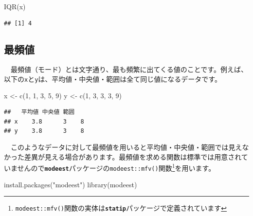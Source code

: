 \documentclass[
  12pt,
]{book}
\newenvironment{Shaded}{\begin{snugshade}}{\end{snugshade}}
\newcommand{\DecValTok}[1]{\textcolor[rgb]{0.00,0.00,0.81}{#1}}
\newcommand{\FunctionTok}[1]{\textcolor[rgb]{0.00,0.00,0.00}{#1}}
\newcommand{\NormalTok}[1]{#1}
\newcommand{\OtherTok}[1]{\textcolor[rgb]{0.56,0.35,0.01}{#1}}
\newcommand{\StringTok}[1]{\textcolor[rgb]{0.31,0.60,0.02}{#1}}
\begin{document}
\begin{Shaded}
\begin{Highlighting}[numbers=left,,]
\FunctionTok{IQR}\NormalTok{(x)}
\end{Highlighting}
\end{Shaded}

\begin{verbatim}
## [1] 4
\end{verbatim}

\newpage

\hypertarget{ux6700ux983bux5024}{%
\subsection{\texorpdfstring{最頻値}{最頻値}}\label{ux6700ux983bux5024}}

　最頻値（モード）とは文字通り、最も頻繁に出てくる値のことです。例えば、以下の\texttt{x}と\texttt{y}は、平均値・中央値・範囲は全て同じ値になるデータです。

\begin{Shaded}
\begin{Highlighting}[numbers=left,,]
\NormalTok{x }\OtherTok{\textless{}{-}} \FunctionTok{c}\NormalTok{(}\DecValTok{1}\NormalTok{, }\DecValTok{1}\NormalTok{, }\DecValTok{3}\NormalTok{, }\DecValTok{5}\NormalTok{, }\DecValTok{9}\NormalTok{)}
\NormalTok{y }\OtherTok{\textless{}{-}} \FunctionTok{c}\NormalTok{(}\DecValTok{1}\NormalTok{, }\DecValTok{3}\NormalTok{, }\DecValTok{3}\NormalTok{, }\DecValTok{3}\NormalTok{, }\DecValTok{9}\NormalTok{)}
\end{Highlighting}
\end{Shaded}

\begin{verbatim}
##   平均値 中央値 範囲
## x    3.8      3    8
## y    3.8      3    8
\end{verbatim}

　このようなデータに対して最頻値を用いると平均値・中央値・範囲では見えなかった差異が見える場合があります。最頻値を求める関数は標準では用意されていませんので\textbf{\texttt{modeest}}パッケージの\texttt{modeest::mfv()}関数\footnote{\texttt{modeest::mfv()}関数の実体は\textbf{\texttt{statip}}パッケージで定義されています}を用います。

\begin{Shaded}
\begin{Highlighting}[numbers=left,,]
\FunctionTok{install.packages}\NormalTok{(}\StringTok{"modeest"}\NormalTok{)}
\FunctionTok{library}\NormalTok{(modeest)}
\end{Highlighting}
\end{Shaded}
\end{document}
